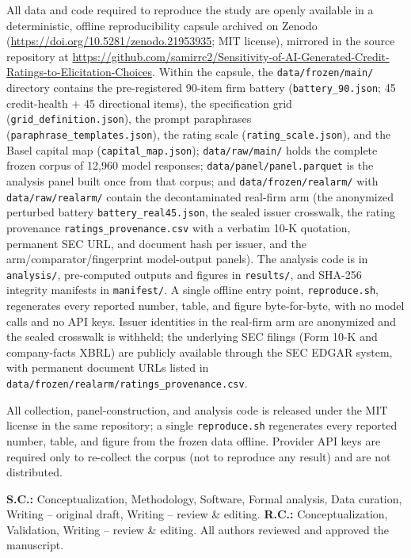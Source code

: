 \documentclass[pdflatex,sn-nature,lineno]{sn-jnl}
\theoremstyle{thmstyleone}
\begin{document}
\backmatter
{}
All data and code required to reproduce the study are openly available in a deterministic, offline
reproducibility capsule archived on Zenodo (\url{https://doi.org/10.5281/zenodo.21953935}; MIT license),
mirrored in the source repository at \url{https://github.com/samirrc2/Sensitivity-of-AI-Generated-Credit-Ratings-to-Elicitation-Choices}. Within the capsule, the
\texttt{data/frozen/main/} directory contains the pre-registered 90-item firm battery
(\texttt{battery\_90.json}; 45 credit-health $+$ 45 directional items), the specification grid
(\texttt{grid\_definition.json}), the prompt paraphrases (\texttt{paraphrase\_templates.json}), the
rating scale (\texttt{rating\_scale.json}), and the Basel capital map (\texttt{capital\_map.json});
\texttt{data/raw/main/} holds the complete frozen corpus of 12{,}960 model responses;
\texttt{data/panel/panel.parquet} is the analysis panel built once from that corpus; and
\texttt{data/frozen/realarm/} with \texttt{data/raw/realarm/} contain the decontaminated real-firm arm
(the anonymized perturbed battery \texttt{battery\_real45.json}, the sealed issuer crosswalk, the rating
provenance \texttt{ratings\_provenance.csv} with a verbatim 10-K quotation, permanent SEC URL, and
document hash per issuer, and the arm/comparator/fingerprint model-output panels). The analysis code is
in \texttt{analysis/}, pre-computed outputs and figures in \texttt{results/}, and SHA-256 integrity
manifests in \texttt{manifest/}. A single offline entry point, \texttt{reproduce.sh}, regenerates every
reported number, table, and figure byte-for-byte, with no model calls and no API keys. Issuer identities
in the real-firm arm are anonymized and the sealed crosswalk is withheld; the underlying SEC filings
(Form 10-K and company-facts XBRL) are publicly available through the SEC EDGAR system, with permanent
document URLs listed in \texttt{data/frozen/realarm/ratings\_provenance.csv}.

All collection, panel-construction, and analysis code is released under the MIT license in the same
repository; a single \texttt{reproduce.sh} regenerates every reported number, table, and figure from the
frozen data offline. Provider API keys are required only to re-collect the corpus (not to reproduce any
result) and are not distributed.



\textbf{S.C.:} Conceptualization, Methodology, Software, Formal analysis, Data curation, Writing --
original draft, Writing -- review \& editing. \textbf{R.C.:} Conceptualization, Validation, Writing --
review \& editing. All authors reviewed and approved the manuscript.
\end{document}

